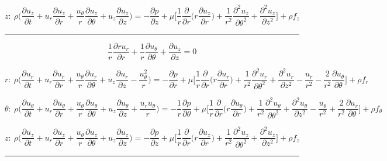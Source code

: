 \documentclass{article}
\begin{document}
            \[z: \ \rho \bigg(\frac{\partial u_{z}}{\partial t} + u_{r} \frac{\partial u_{z}}{\partial r} + \frac{u_{\theta}}{r}\frac{\partial u_{z}}{\partial \theta} + u_{z}\frac{\partial u_{z}}{\partial z} \bigg) = -\frac{\partial p}{\partial z} + \mu \bigg[ \frac{1}{r}\frac{\partial}{\partial r} \bigg(r \frac{\partial u_{z}}{\partial r}\bigg) + \frac{1}{r^{2}} \frac{\partial^{2} u_{z}}{\partial \theta^{2}} + \frac{\partial^{2} u_{z}}{\partial z^{2}} \bigg] + \rho f_{z}\]

 \vspace{.5cm} \hrule   \vspace{.5cm} \[\frac{1}{r}\frac{\partial ru_{r}}{\partial r} + \frac{1}{r}\frac{\partial u_{\theta}}{\partial \theta} + \frac{\partial u_{z}}{\partial z}=0\]
            
            \[r: \ \rho \bigg(\frac{\partial u_{r}}{\partial t} + u_{r} \frac{\partial u_{r}}{\partial r} + \frac{u_{\theta}}{r}\frac{\partial u_{r}}{\partial \theta} + u_{z}\frac{\partial u_{r}}{\partial z} - \frac{u_{\theta}^{2}}{r} \bigg) = -\frac{\partial p}{\partial r} + \mu \bigg[ \frac{1}{r}\frac{\partial}{\partial r} \bigg(r \frac{\partial u_{r}}{\partial r}\bigg) + \frac{1}{r^{2}} \frac{\partial^{2} u_{r}}{\partial \theta^{2}} + \frac{\partial^{2} u_{r}}{\partial z^{2}} - \frac{u_{r}}{r^{2}} - \frac{2}{r^{2}}\frac{\partial u_{\theta}}{\partial \theta}\bigg] + \rho f_{r}\]
            
            \[\theta: \ \rho \bigg(\frac{\partial u_{\theta}}{\partial t} + u_{r} \frac{\partial u_{\theta}}{\partial r} + \frac{u_{\theta}}{r} \frac{\partial u_{\theta}}{\partial \theta} + u_{z}\frac{\partial u_{\theta}}{\partial z} + \frac{u_{r}u_{\theta}}{r} \bigg) = -\frac{1}{r} \frac{\partial p}{\partial \theta} + \mu \bigg[ \frac{1}{r}\frac{\partial}{\partial r} \bigg(r \frac{\partial u_{\theta}}{\partial r}\bigg) + \frac{1}{r^{2}} \frac{\partial^{2} u_{\theta}}{\partial \theta^{2}} + \frac{\partial^{2} u_{\theta}}{\partial z^{2}} - \frac{u_{\theta}}{r^{2}} + \frac{2}{r^{2}}\frac{\partial u_{r}}{\partial \theta}\bigg] + \rho f_{\theta}\]
            
            \[z: \ \rho \bigg(\frac{\partial u_{z}}{\partial t} + u_{r} \frac{\partial u_{z}}{\partial r} + \frac{u_{\theta}}{r}\frac{\partial u_{z}}{\partial \theta} + u_{z}\frac{\partial u_{z}}{\partial z} \bigg) = -\frac{\partial p}{\partial z} + \mu \bigg[ \frac{1}{r}\frac{\partial}{\partial r} \bigg(r \frac{\partial u_{z}}{\partial r}\bigg) + \frac{1}{r^{2}} \frac{\partial^{2} u_{z}}{\partial \theta^{2}} + \frac{\partial^{2} u_{z}}{\partial z^{2}} \bigg] + \rho f_{z}\]

 \vspace{.5cm} \hrule   \vspace{.5cm}
 
\end{document}
